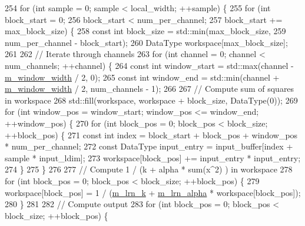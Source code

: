 \begin{DoxyCode}
254     \textcolor{keywordflow}{for} (\textcolor{keywordtype}{int} sample = 0; sample < local\_width; ++sample) \{
255       \textcolor{keywordflow}{for} (\textcolor{keywordtype}{int} block\_start = 0;
256           block\_start < num\_per\_channel;
257           block\_start += max\_block\_size) \{
258         \textcolor{keyword}{const} \textcolor{keywordtype}{int} block\_size = std::min(max\_block\_size,
259                                         num\_per\_channel - block\_start);
260         DataType workspace[max\_block\_size];
261 
262         \textcolor{comment}{// Iterate through channels}
263         \textcolor{keywordflow}{for} (\textcolor{keywordtype}{int} channel = 0; channel < num\_channels; ++channel) \{
264           \textcolor{keyword}{const} \textcolor{keywordtype}{int} window\_start = std::max(channel - \hyperlink{classlbann_1_1local__response__normalization__layer_a4914619a19eb43efcf8240b8a1e0c090}{m\_window\_width} / 2, 0);
265           \textcolor{keyword}{const} \textcolor{keywordtype}{int} window\_end = std::min(channel + \hyperlink{classlbann_1_1local__response__normalization__layer_a4914619a19eb43efcf8240b8a1e0c090}{m\_window\_width} / 2, num\_channels - 1);
266 
267           \textcolor{comment}{// Compute sum of squares in workspace}
268           std::fill(workspace, workspace + block\_size, DataType(0));
269           \textcolor{keywordflow}{for} (\textcolor{keywordtype}{int} window\_pos = window\_start; window\_pos <= window\_end; ++window\_pos) \{
270             \textcolor{keywordflow}{for} (\textcolor{keywordtype}{int} block\_pos = 0; block\_pos < block\_size; ++block\_pos) \{
271               \textcolor{keyword}{const} \textcolor{keywordtype}{int} index = block\_start + block\_pos + window\_pos * num\_per\_channel;
272               \textcolor{keyword}{const} DataType input\_entry = input\_buffer[index + sample * input\_ldim];
273               workspace[block\_pos] += input\_entry * input\_entry;
274             \}
275           \}
276 
277           \textcolor{comment}{// Compute 1 / (k + alpha * sum(x^2) ) in workspace}
278           \textcolor{keywordflow}{for} (\textcolor{keywordtype}{int} block\_pos = 0; block\_pos < block\_size; ++block\_pos) \{
279             workspace[block\_pos] = 1 / (\hyperlink{classlbann_1_1local__response__normalization__layer_a896f875d6f6a763c1cb0dbd43679164e}{m\_lrn\_k} + \hyperlink{classlbann_1_1local__response__normalization__layer_a85c25a68888e2e9d163a820326fc09ff}{m\_lrn\_alpha} * workspace[block\_pos]);
280           \}
281 
282           \textcolor{comment}{// Compute output}
283           \textcolor{keywordflow}{for} (\textcolor{keywordtype}{int} block\_pos = 0; block\_pos < block\_size; ++block\_pos) \{

\end{DoxyCode}
